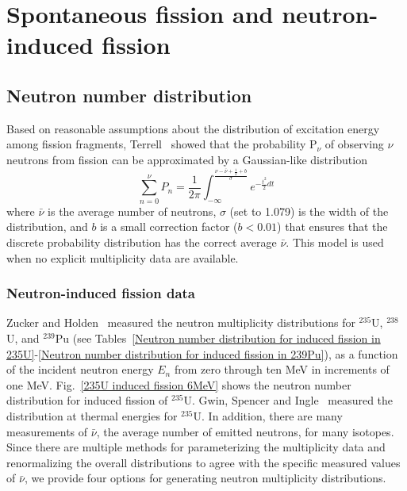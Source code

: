 \section{Spontaneous fission and neutron-induced fission\label{neutrons}}

\subsection{Neutron number distribution}\label{sec:neutron number distribution}

Based on reasonable assumptions about the distribution of excitation
energy among fission fragments, Terrell~\cite{Terrell 1957} showed
that the probability P$_\nu$ of observing $\nu$ neutrons from fission
can be approximated by a Gaussian-like distribution
\begin{equation}
\sum_{n=0}^{\nu}P_n = \frac{1}{2\pi}\int_{-\infty}^{\frac{\nu-\bar{\nu} 
                    + \frac{1}{2}+b}{\sigma}}e^{-\frac{t^2}{2}dt}
\end{equation}
where $\bar{\nu}$ is the average number of neutrons, $\sigma$ (set to
1.079) is the width of the distribution, and $b$ is a small correction
factor ($b<0.01$) that ensures that the discrete probability
distribution has the correct average $\bar{\nu}$. This model is used
when no explicit multiplicity data are available.

\subsubsection*{Neutron-induced fission data}

Zucker and Holden~\cite{Zucker and Holden 1986} measured the neutron
multiplicity distributions for $^{235}$U, $^{238}$U, and $^{239}$Pu
(see Tables~\ref{Neutron number distribution for induced fission in
235U}-\ref{Neutron number distribution for induced fission in 239Pu}),
as a function of the incident neutron energy $E_n$ from 
zero through ten MeV in increments of one MeV.  Fig.~\ref{235U induced
fission 6MeV} shows the neutron number distribution for induced
fission of $^{235}$U. Gwin, Spencer and Ingle~\cite{Gwin 1984}
measured the distribution at thermal energies for $^{235}$U. In
addition, there are many measurements of $\bar{\nu}$, the average
number of emitted neutrons, for many isotopes. Since there are multiple
methods for parameterizing the multiplicity data and 
renormalizing the overall distributions to agree with the specific measured
values of $\bar{\nu}$, we provide four options for generating 
neutron multiplicity distributions. 

